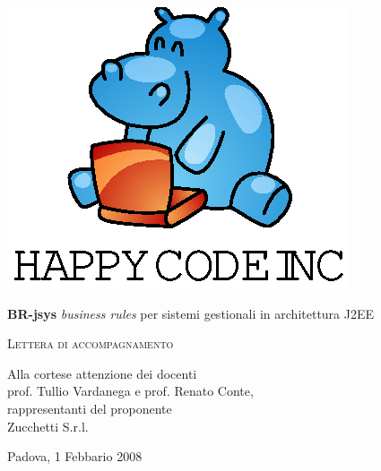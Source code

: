\documentclass[11pt,titlepage,a4paper]{report}
\begin{document}
\begin{titlepage}
\begin{center}
\vspace*{0.5in}
\includegraphics{logo.eps}
\vspace*{0.2in}

{\Large \textbf{BR-jsys}}
{\Large \emph{business rules} per sistemi gestionali in architettura J2EE } 
\vspace{2in}

\Huge \textsc{ Lettera di accompagnamento }

\end{center}
\end{titlepage}
\vspace*{0.5in}


\thispagestyle{plain}
\begin{flushright}
Alla cortese attenzione dei docenti\\
prof. Tullio Vardanega e prof. Renato Conte,\\
rappresentanti del proponente\\
Zucchetti S.r.l.
\end{flushright}
Padova, 1 Febbario 2008 \\
\end{document}
